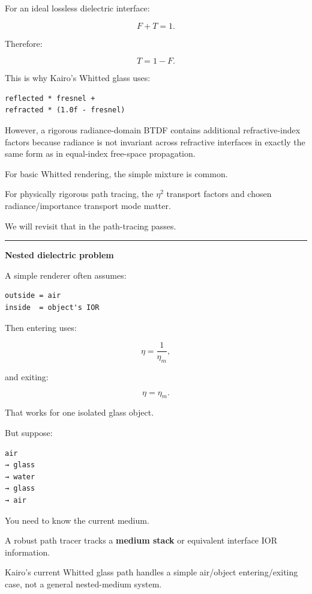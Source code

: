 For an ideal lossless dielectric interface:

\[
\boxed{
F+T=1.
}
\]

Therefore:

\[
T=1-F.
\]

This is why Kairo's Whitted glass uses:

\begin{verbatim}
reflected * fresnel +
refracted * (1.0f - fresnel)
\end{verbatim}

However, a rigorous radiance-domain BTDF contains additional refractive-index factors because radiance is not invariant across refractive interfaces in exactly the same form as in equal-index free-space propagation.

For basic Whitted rendering, the simple mixture is common.

For physically rigorous path tracing, the \(\eta^2\) transport factors and chosen radiance/importance transport mode matter.

We will revisit that in the path-tracing passes.

\begin{center}\rule{0.5\linewidth}{0.5pt}\end{center}

\textbf{Nested dielectric problem}

A simple renderer often assumes:

\begin{verbatim}
outside = air
inside  = object's IOR
\end{verbatim}

Then entering uses:

\[
\eta=
\frac1{\eta_m},
\]

and exiting:

\[
\eta=
\eta_m.
\]

That works for one isolated glass object.

But suppose:

\begin{verbatim}
air
→ glass
→ water
→ glass
→ air
\end{verbatim}

You need to know the current medium.

A robust path tracer tracks a \textbf{medium stack} or equivalent interface IOR information.

Kairo's current Whitted glass path handles a simple air/object entering/exiting case, not a general nested-medium system.

